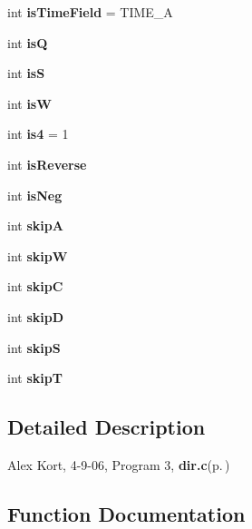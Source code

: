 \begin{CompactItemize}
\item 
int {\bf is\-Time\-Field} = TIME\_\-A\label{dir_8c_a6e5358320a6115ba95819ece12c7b4a}

\item 
int {\bf is\-Q}\label{dir_8c_c2899548f1da85d5e578ceef94caa9ac}

\item 
int {\bf is\-S}\label{dir_8c_93832a34049bec62af7e25ba08642608}

\item 
int {\bf is\-W}\label{dir_8c_1ac30dc500ede985cec66d8a4035dd6b}

\item 
int {\bf is4} = 1\label{dir_8c_9760078654e701becdc081dc0a457c8b}

\item 
int {\bf is\-Reverse}\label{dir_8c_41a90acb7ea2f779996ac9e287753d73}

\item 
int {\bf is\-Neg}\label{dir_8c_4a17bc032c2a40a40d15a4c0a7b7dc2f}

\item 
int {\bf skip\-A}\label{dir_8c_654267ba8616a84f080facb53d923062}

\item 
int {\bf skip\-W}\label{dir_8c_5d9429429b82914a1695c4b7196225da}

\item 
int {\bf skip\-C}\label{dir_8c_7bfad51d9705a90f89e1a16d194cd402}

\item 
int {\bf skip\-D}\label{dir_8c_b0137346ce016474f6a139e39463d3c2}

\item 
int {\bf skip\-S}\label{dir_8c_3f359b8896d5dc8250b894889afa7fb2}

\item 
int {\bf skip\-T}\label{dir_8c_2f3568e0532095431561eb0ff1e7a44e}

\end{CompactItemize}


\subsection{Detailed Description}
Alex Kort, 4-9-06, Program 3, {\bf dir.c}{\rm (p.\,\pageref{dir_8c})} 

\subsection{Function Documentation}
